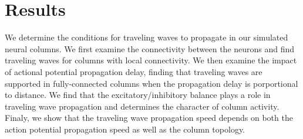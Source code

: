 \documentclass[a4paper,11pt]{article}
\begin{document}
\section{Results}
We determine the conditions for traveling waves to propagate in our simulated neural columns.
We first examine the connectivity between the neurons and find traveling waves for columns with local connectivity.
We then examine the impact of actional potential propagation delay, finding that traveling waves are supported in fully-connected columns when the propagation delay is porportional to distance.
We find that the excitatory/inhibitory balance plays a role in traveling wave propagation and determines the character of column activity.
Finaly, we show that the traveling wave propagation speed depends on both the action potential propagation speed as well as the column topology.
\end{document}
